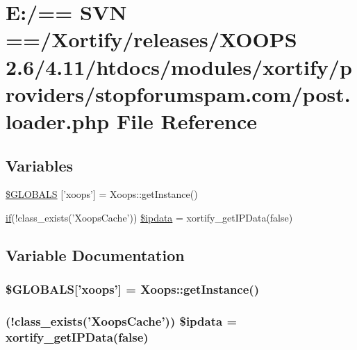 \hypertarget{stopforumspam_8com_2post_8loader_8php}{\section{E\-:/== S\-V\-N ==/\-Xortify/releases/\-X\-O\-O\-P\-S 2.6/4.11/htdocs/modules/xortify/providers/stopforumspam.com/post.loader.\-php File Reference}
\label{stopforumspam_8com_2post_8loader_8php}
}
\subsection*{Variables}
\begin{DoxyCompactItemize}
\item 
\hyperlink{stopforumspam_8com_2post_8loader_8php_ad10934112c0d18cf6b358d47afa6fcf1}{\$\-G\-L\-O\-B\-A\-L\-S} \mbox{[}'xoops'\mbox{]} = Xoops\-::get\-Instance()
\item 
\hyperlink{poll_2index_8php_ae404acbb304be6b6ac443de921697faf}{if}(!class\-\_\-exists('Xoops\-Cache')) \hyperlink{stopforumspam_8com_2post_8loader_8php_abace3cecef5a8bb6ab0a2f103c592f88}{\$ipdata} = xortify\-\_\-get\-I\-P\-Data(false)
\end{DoxyCompactItemize}


\subsection{Variable Documentation}
\hypertarget{stopforumspam_8com_2post_8loader_8php_ad10934112c0d18cf6b358d47afa6fcf1}{
\subsubsection[{\$\-G\-L\-O\-B\-A\-L\-S}]{\setlength{\rightskip}{0pt plus 5cm}\$G\-L\-O\-B\-A\-L\-S\mbox{[}'xoops'\mbox{]} = Xoops\-::get\-Instance()}}\label{stopforumspam_8com_2post_8loader_8php_ad10934112c0d18cf6b358d47afa6fcf1}
\hypertarget{stopforumspam_8com_2post_8loader_8php_abace3cecef5a8bb6ab0a2f103c592f88}{
\subsubsection[{\$ipdata}]{ (!class\-\_\-exists('Xoops\-Cache')) \$ipdata = xortify\-\_\-get\-I\-P\-Data(false)}}\label{stopforumspam_8com_2post_8loader_8php_abace3cecef5a8bb6ab0a2f103c592f88}
